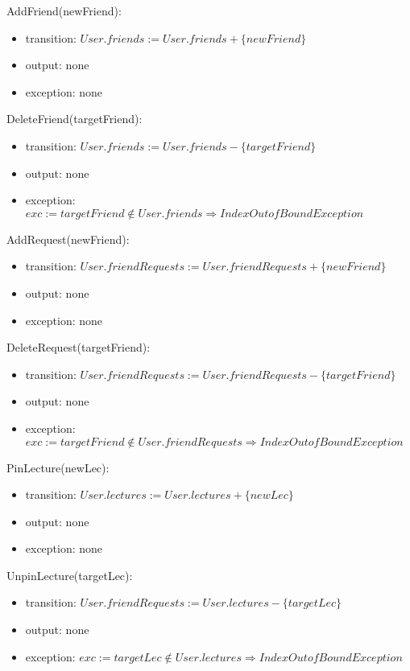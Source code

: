 \documentclass[12pt, titlepage]{article}
\begin{document}
\noindent AddFriend(newFriend):
\begin{itemize}
\item transition: $User.friends := User.friends + \{newFriend\}$ 
\item output: none
\item exception: none
\end{itemize}

\noindent DeleteFriend(targetFriend):
\begin{itemize}
\item transition: $User.friends := User.friends - \{targetFriend\}$ 
\item output: none
\item exception: $exc := targetFriend \notin User.friends \Rightarrow IndexOutofBound Exception$
\end{itemize}

\noindent AddRequest(newFriend):
\begin{itemize}
\item transition: $User.friendRequests := User.friendRequests + \{newFriend\}$ 
\item output: none
\item exception: none
\end{itemize}

\noindent DeleteRequest(targetFriend):
\begin{itemize}
\item transition: $User.friendRequests := User.friendRequests - \{targetFriend\}$ 
\item output: none
\item exception: $exc := targetFriend \notin User.friendRequests \Rightarrow IndexOutofBound Exception$
\end{itemize}

\noindent PinLecture(newLec):
\begin{itemize}
\item transition: $User.lectures := User.lectures + \{newLec\}$ 
\item output: none
\item exception: none
\end{itemize}

\noindent UnpinLecture(targetLec):
\begin{itemize}
\item transition: $User.friendRequests := User.lectures - \{targetLec\}$ 
\item output: none
\item exception: $exc := targetLec \notin User.lectures \Rightarrow IndexOutofBound Exception$
\end{itemize}
\end{document}
